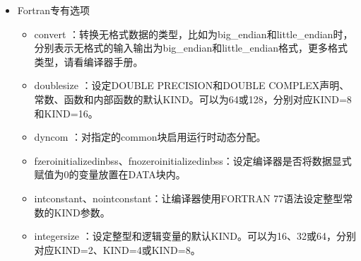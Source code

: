 \documentclass[a4paper,12pt,english]{sphinxmanual}
\begin{document}
\begin{itemize}
\begin{itemize}
\begin{itemize}
\item {} 
\sphinxAtStartPar
stack：检查stack的悬挂指针参考。

\item {} 
\sphinxAtStartPar
all：检查上述所有的悬挂指针参考。

\end{itemize}

\item {} 
\sphinxAtStartPar
\sphinxhyphen{}fkeep\sphinxhyphen{}static\sphinxhyphen{}consts、\sphinxhyphen{}fno\sphinxhyphen{}keep\sphinxhyphen{}static\sphinxhyphen{}consts：设定编译器是否保留在源文件中没有参考的变量分配。

\end{itemize}

\item {} 
\sphinxAtStartPar
Fortran专有选项
\begin{itemize}
\item {} 
\sphinxAtStartPar
\sphinxhyphen{}convert \sphinxstyleemphasis{{[}keyword{]}}：转换无格式数据的类型，比如为big\_endian和little\_endian时，分别表示无格式的输入输出为big\_endian和little\_endian格式，更多格式类型，请看编译器手册。

\item {} 
\sphinxAtStartPar
\sphinxhyphen{}double\sphinxhyphen{}size ：设定DOUBLE PRECISION和DOUBLE COMPLEX声明、常数、函数和内部函数的默认KIND。可以为64或128，分别对应KIND=8和KIND=16。

\item {} 
\sphinxAtStartPar
\sphinxhyphen{}dyncom ：对指定的common块启用运行时动态分配。

\item {} 
\sphinxAtStartPar
\sphinxhyphen{}fzero\sphinxhyphen{}initialized\sphinxhyphen{}in\sphinxhyphen{}bss、\sphinxhyphen{}fno\sphinxhyphen{}zero\sphinxhyphen{}initialized\sphinxhyphen{}in\sphinxhyphen{}bss：设定编译器是否将数据显式赋值为0的变量放置在DATA块内。

\item {} 
\sphinxAtStartPar
\sphinxhyphen{}intconstant、\sphinxhyphen{}nointconstant：让编译器使用FORTRAN 77语法设定整型常数的KIND参数。

\item {} 
\sphinxAtStartPar
\sphinxhyphen{}integer\sphinxhyphen{}size ：设定整型和逻辑变量的默认KIND。可以为16、32或64，分别对应KIND=2、KIND=4或KIND=8。


\end{itemize}
\end{itemize}
\end{document}
